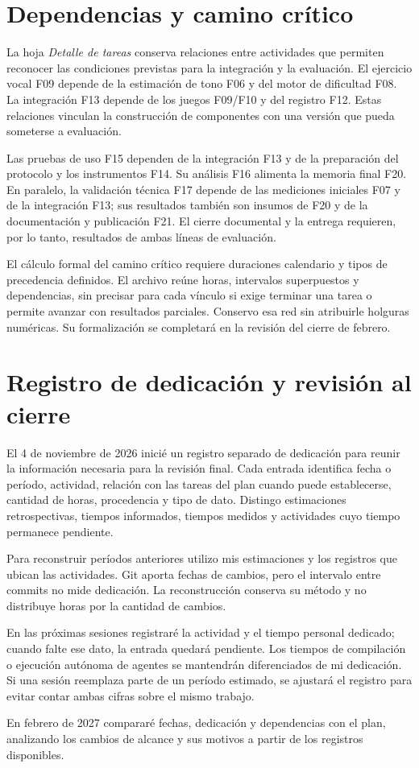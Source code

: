 \section{Dependencias y camino crítico}
La hoja \textit{Detalle de tareas} conserva relaciones entre actividades que
permiten reconocer las condiciones previstas para la integración y la evaluación.
El ejercicio vocal F09 depende de la estimación de tono F06 y del motor de
dificultad F08. La integración F13 depende de los juegos F09/F10 y del registro
F12. Estas relaciones vinculan la construcción de componentes con una versión
que pueda someterse a evaluación.

Las pruebas de uso F15 dependen de la integración F13 y de la preparación del
protocolo y los instrumentos F14. Su análisis F16 alimenta la memoria final F20.
En paralelo, la validación técnica F17 depende de las mediciones iniciales F07
y de la integración F13; sus resultados también son insumos de F20 y de la
documentación y publicación F21. El cierre documental y la entrega requieren,
por lo tanto, resultados de ambas líneas de evaluación.

El cálculo formal del camino crítico requiere duraciones calendario y tipos
de precedencia definidos. El archivo reúne horas, intervalos superpuestos y
dependencias, sin precisar para cada vínculo si exige terminar una tarea o
permite avanzar con resultados parciales. Conservo esa red sin atribuirle
holguras numéricas. Su formalización se completará en la revisión del cierre
de febrero.

\section{Registro de dedicación y revisión al cierre}
El 4 de noviembre de 2026 inicié un registro separado de dedicación para reunir
la información necesaria para la revisión final. Cada entrada identifica fecha
o período, actividad, relación con las tareas del plan cuando puede establecerse,
cantidad de horas, procedencia y tipo de dato. Distingo estimaciones retrospectivas,
tiempos informados, tiempos medidos y actividades cuyo tiempo permanece pendiente.

Para reconstruir períodos anteriores utilizo mis estimaciones y los registros
que ubican las actividades. Git aporta fechas de cambios, pero el intervalo
entre commits no mide dedicación. La reconstrucción conserva su método y no
distribuye horas por la cantidad de cambios.

En las próximas sesiones registraré la actividad y el tiempo personal dedicado;
cuando falte ese dato, la entrada quedará pendiente. Los tiempos de compilación
o ejecución autónoma de agentes se mantendrán diferenciados de mi dedicación.
Si una sesión reemplaza parte de un período estimado, se ajustará el registro
para evitar contar ambas cifras sobre el mismo trabajo.

En febrero de 2027 compararé fechas, dedicación y dependencias con el plan,
analizando los cambios de alcance y sus motivos a partir de los registros
disponibles.
